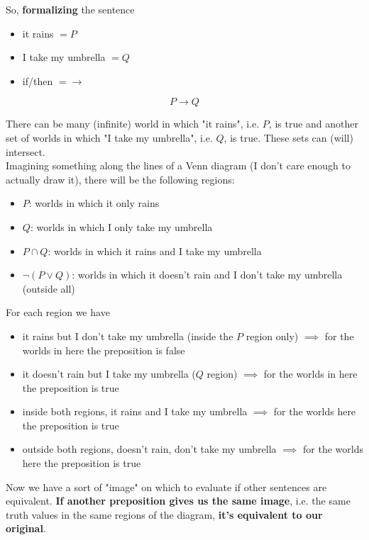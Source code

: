 \documentclass[11pt]{article}
\begin{document}
	\newpage
	
	So, \textbf{formalizing} the sentence
	\begin{itemize}
		\item it rains $= P$
		\item I take my umbrella $= Q$
		\item if/then $= \rightarrow$
	\end{itemize}
	$$ P \rightarrow Q $$
	
	There can be many (infinite) world in which "it rains", i.e. $P$, is true and another set of worlds in which "I take my umbrella", i.e. $Q$, is true. These sets can (will) intersect.\\
	
	Imagining something along the lines of a Venn diagram (I don't care enough to actually draw it), there will be the following regions:
	\begin{itemize}
		\item $P$: worlds in which it only rains
		\item $Q$: worlds in which I only take my umbrella
		\item $P \cap Q$: worlds in which it rains and I take my umbrella
		\item $ \neg (P \vee Q)$: worlds in which it doesn't rain and I don't take my umbrella (outside all)
	\end{itemize}
	
	For each region we have
	\begin{itemize}
		\item it rains but I don't take my umbrella (inside the $P$ region only) $\implies$ for the worlds in here the preposition is false
		\item it doesn't rain but I take my umbrella ($Q$ region) $\implies$ for the worlds in here the preposition is true
		\item inside both regions, it rains and I take my umbrella $\implies$ for the worlds here the preposition is true
		\item outside both regions, doesn't rain, don't take my umbrella $\implies$ for the worlds here the preposition is true
	\end{itemize}
	Now we have a sort of "image" on which to evaluate if other sentences are equivalent. \textbf{If another preposition gives us the same image}, i.e. the same truth values in the same regions of the diagram, \textbf{it's equivalent to our original}.\\
	
	
\end{document}
